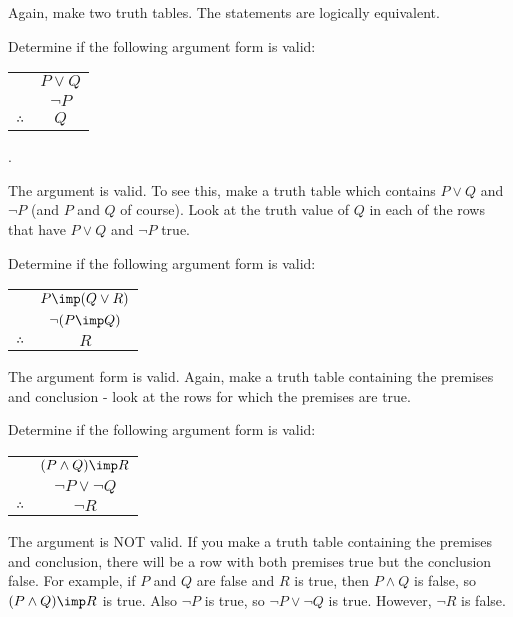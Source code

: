 \begin{questions}
  \begin{answer}
    Again, make two truth tables.  The statements are logically equivalent.
  \end{answer}


  
  
\question Determine if the following argument form is valid: \begin{tabular}{rc} & $P \vee Q$ \\ & $\neg P$ \\ \hline $\therefore$ & $Q$\end{tabular}.

  \begin{answer}
    The argument is valid.  To see this, make a truth table which contains $P \vee Q$ and $\neg P$ (and $P$ and $Q$ of course).  Look at the truth value of $Q$ in each of the rows that have $P \vee Q$ and $\neg P$ true.  
  \end{answer}

  
  
  
\question Determine if the following argument form is valid: \begin{tabular}{rc} & $P \imp (Q \vee R)$ \\ & $\neg(P \imp Q)$ \\ \hline $\therefore$ & $R$\end{tabular}

  \begin{answer}
    The argument form is valid.  Again, make a truth table containing the premises and conclusion - look at the rows for which the premises are true.
  \end{answer}


  
\question Determine if the following argument form is valid: \begin{tabular}{rc} & $(P \wedge Q) \imp R$ \\ & $\neg P \vee \neg Q$ \\ \hline $\therefore$ & $\neg R$\end{tabular}

  \begin{answer}
    The argument is NOT valid.  If you make a truth table containing the premises and conclusion, there will be a row with both premises true but the conclusion false.  For example, if $P$ and $Q$ are false and $R$ is true, then $P \wedge Q$ is false, so $(P \wedge Q) \imp R$ is true.  Also $\neg P$ is true, so $\neg P \vee \neg Q$ is true.  However, $\neg R$ is false.
  \end{answer}



\end{questions}
